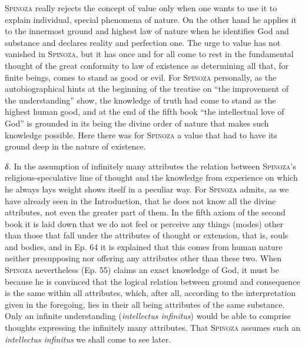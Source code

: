 \documentclass[12pt]{article}
\newcommand{\opage}[1]{\marginnote{\footnotesize\textit{[#1]}}}
\begin{document}
\textsc{Spinoza} really rejects the concept of value only when one wants to use it to
explain individual, special phenomena of nature. On the other hand he applies it to
the innermost ground and highest law of nature when he identifies God and substance
and declares reality and perfection one. The urge to value has not vanished in
\textsc{Spinoza}, but it has once and for all come to rest in the fundamental thought
of the great conformity to law of existence as determining all that, for finite
beings, comes to stand as good or evil. For \textsc{Spinoza} personally, as the
autobiographical hints at the beginning of the treatise on ``the improvement of the
understanding'' show, the knowledge of truth had come to stand as the highest human
good, and at the end of the fifth book ``the intellectual love of God'' is grounded in
its being the divine order of nature that makes such knowledge possible. Here there
was for \textsc{Spinoza} a value that had to have its ground deep in the nature of
existence.

\textit{δ.} In the assumption of infinitely many attributes the relation between
\textsc{Spinoza}'s religious-speculative line of thought and the knowledge from
experience on which he always lays weight shows itself in a peculiar way. For
\textsc{Spinoza} admits, as we have already seen in the Introduction, that he does not
know all the divine attributes, not even the greater part of them. In the fifth axiom
of the second book it is laid down that we do not feel or perceive any things (modes)
other than those that fall under the attributes of thought or extension, that is,
souls and bodies, and in Ep. 64 it is explained that this comes from human nature
neither presupposing nor offering any attributes other than these two. When
\textsc{Spinoza} nevertheless (Ep. 55) claims an exact knowledge of God, it must be
because he is convinced that the logical relation between ground and consequence is the
same within all attributes, which, after all, according to the interpretation given in
the foregoing, lies in their all being attributes \opage{23}of the same substance.
Only an infinite understanding (\textit{intellectus infinitus}) would be able to
comprise thoughts expressing the infinitely many attributes. That \textsc{Spinoza}
assumes such an \textit{intellectus infinitus} we shall come to see later.
\end{document}
